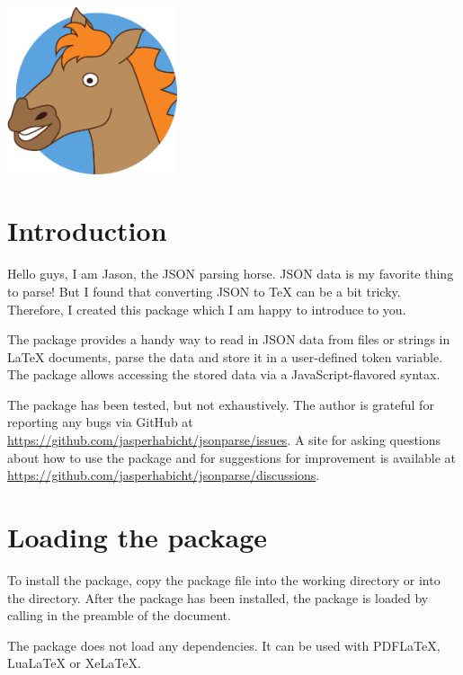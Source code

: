 \documentclass[a4paper]{article}
\begin{document}
\vspace*{-1cm}
\noindent\hspace*{-3.5mm}\includegraphics[width=5cm]{jason/jason.pdf}

\printdoctitle

\bigskip

\section{Introduction}

Hello guys, I am Jason, the JSON parsing horse. JSON data is my favorite thing to parse! But I found that converting JSON to TeX can be a bit tricky. Therefore, I created this package which I am happy to introduce to you.

The  package provides a handy way to read in JSON data from files or strings in LaTeX documents, parse the data and store it in a user-defined token variable. The package allows accessing the stored data via a JavaScript-flavored syntax.

The package has been tested, but not exhaustively. The author is grateful for reporting any bugs via GitHub at \url{https://github.com/jasperhabicht/jsonparse/issues}. A site for asking questions about how to use the package and for suggestions for improvement is available at \url{https://github.com/jasperhabicht/jsonparse/discussions}.

\section{Loading the package}

To install the package, copy the package file  into the working directory or into the  directory. After the package has been installed, the  package is loaded by calling \macro{\usepackage{jsonparse}} in the preamble of the document.

The package does not load any dependencies. It can be used with PDFLaTeX, LuaLaTeX or XeLaTeX.
\end{document}
